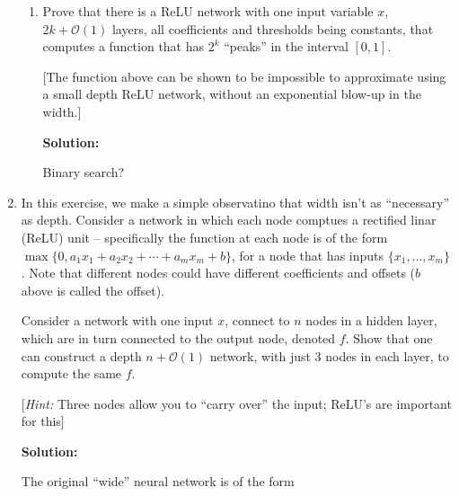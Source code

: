 \documentclass[12pt]{article}
\newcommand{\BigO}[1]{\mathcal{O}\left( #1 \right)}
\def\layersep{2.5cm}
\begin{document}
\begin{enumerate}
\begin{enumerate}
\item Prove that there is a ReLU network with one input variable $x$, $2k + \BigO{1}$ layers, all coefficients and thresholds being constants, that computes a function that has $2^{k}$ ``peaks'' in the interval $[0,1]$.

[The function above can be shown to be impossible to approximate using a small depth ReLU network, without an exponential blow-up in the width.]

   {\bf Solution:}

Binary search?

\end{enumerate}

\newpage

\item In this exercise, we make a simple observatino that width isn't as ``necessary'' as depth. Consider a network in which each node comptues a rectified linar (ReLU) unit -- specifically the function at each node is of the form $\max \{0, a_{1}x_{1} + a_{2}x_{2} + \cdots + a_{m}x_{m} + b\}$, for a node that has inputs $\{ x_{1}, \ldots, x_{m}\}$. Note that different nodes could have different coefficients and offsets ($b$ above is called the offset).

Consider a network with one input $x$, connect to $n$ nodes in a hidden layer, which are in turn connected to the output node, denoted $f$. Show that one can construct a depth $n + \BigO{1}$ network, with just 3 nodes in each layer, to compute the same $f$.

[{\em Hint:} Three nodes allow you to ``carry over'' the input; ReLU's are important for this]

   {\bf Solution:}

The original ``wide'' neural network is of the form

\begin{figure}[H]
\centering
{}
\end{figure}
\end{enumerate}
\end{document}
